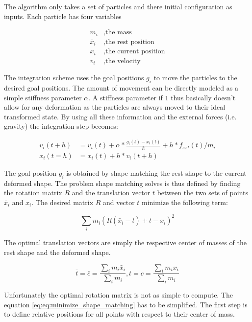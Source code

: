 The algorithm only takes a set of particles and there initial configuration as inputs. Each particle has four variables

\begin{align*}
m_i &, \text{the mass} \\
\bar{x}_i &, \text{the rest position} \\
x_i &, \text{the current position} \\
v_i &, \text{the velocity}
\end{align*}

The integration scheme uses the goal positions \(g_i\) to move the particles to the desired goal positions. The amount of movement can be directly modeled as a simple stiffness parameter \(\alpha\). A stiffness parameter if \(1\) thus basically doesn't allow for any deformation as the particles are always moved to their ideal transformed state. By using all these information and the external forces (i.e. gravity) the integration step becomes:

\begin{align}
v_i(t+h) &= v_i(t) + \alpha * \frac{g_i(t)-x_i(t)}{h} + h * f_{ext}(t)/m_i \\
x_i(t=h) &= x_i(t) + h * v_i(t+h)
\end{align}

The goal position \(g_i\) is obtained by shape matching the rest shape to the current deformed shape. The problem shape matching solves is thus defined by finding the rotation matrix \(R\) and the translation vector \(t\) between the two sets of points \(\bar{x}_i\) and \(x_i\). The desired matrix \(R\) and vector \(t\) minimize the following term:

\begin{equation}
\sum\limits_i m_i(R(\bar{x}_i-\bar{t})+t-x_i)^2
\label{eq:minimize_shape_matching}
\end{equation}

The optimal translation vectors are simply the respective center of masses of the rest shape and the deformed shape.

\begin{equation}
\bar{t} = \bar{c} = \frac{\sum_{i} m_i \bar{x}_i}{\sum_{i}m_i}, t = c = \frac{\sum_{i} m_i x_i}{\sum_{i}m_i}
\end{equation}

Unfortunately the optimal rotation matrix is not as simple to compute. The equation \ref{eq:eq:minimize_shape_matching} has to be simplified. The first step is to define relative positions for all points with respect to their center of mass.

